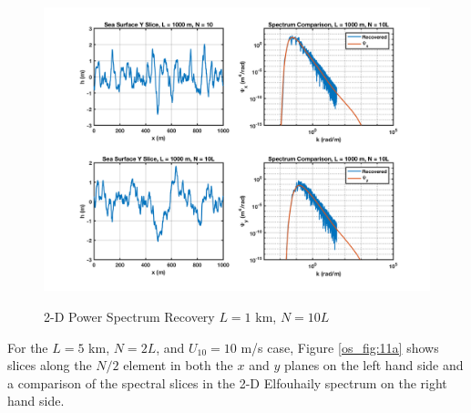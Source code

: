 \begin{figure}[H]
  \begin{center}
\includegraphics[width=6in]{../media/Ocean_Surface/sea_surface_2d_slices_1000_10.png}
  \end{center}
  \renewcommand{\baselinestretch}{1} \small\normalsize
  \begin{quote}
    \caption[2-D Power Spectrum Recovery $L = 1$ km, $N = 10L$]{2-D Power Spectrum Recovery $L = 1$ km, $N = 10L$\label{os_fig:10a}}
  \end{quote}
\end{figure}
\renewcommand{\baselinestretch}{2} \small\normalsize

For the $L = 5$ km, $N = 2L$, and $U_{10} = 10$ m/s case, Figure \ref{os_fig:11a} shows slices along the $N/2$ element in both the $x$ and $y$ planes on the left hand side and a comparison of the spectral slices in the 2-D Elfouhaily spectrum on the right hand side.

